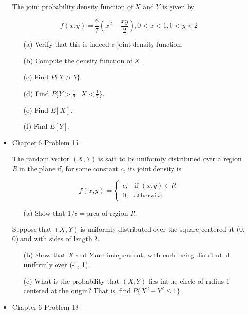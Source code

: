 \documentclass[11pt]{article}
\begin{document}
\begin{itemize}
    The joint probability density function of $X$ and $Y$ is given by
    
    $$
    f(x, y) = \frac{6}{7}(x^2 + \frac{xy}{2}), 0 < x < 1, 0 < y < 2
    $$
    
    \begin{itemize}
    \item[(a)] Verify that this is indeed a joint density function.
    \item[(b)] Compute the density function of $X$.
    \item[(c)] Find $P\{X > Y\}$.
    \item[(d)] Find $P\{Y > \frac{1}{2} \mid X < \frac{1}{2}\}$.
    \item[(e)] Find $E[X]$.
    \item[(f)] Find $E[Y]$.
    \end{itemize}
    

    \item
    Chapter 6 Problem  15
    
    The random vector $(X, Y)$ is said to be uniformly distributed over a region $R$ in the plane if, for some constant $c$, its joint density is
    
    \begin{equation*}
    f(x, y) =
    \begin{cases}
      c, & \text{if $(x, y) \in R$} \\
      0, & \text{otherwise}
    \end{cases}
  \end{equation*}
  
    \begin{itemize}
    \item[(a)] Show that $1/c$ = area of region $R$.
    \end{itemize}
    
    Suppose that $(X, Y)$ is uniformly distributed over the square centered at (0, 0) and with sides of length 2.
    
    \begin{itemize}
    \item[(b)] Show that $X$ and $Y$ are independent, with each being distributed uniformly over (-1, 1).
    \item[(c)] What is the probability that $(X, Y)$ lies int he circle of radius 1 centered at the origin? That is, find $P\{X^2 + Y^2 \leq 1\}$.
    \end{itemize}

    \item
    Chapter 6 Problem 18
    

\end{itemize}
\end{document}
